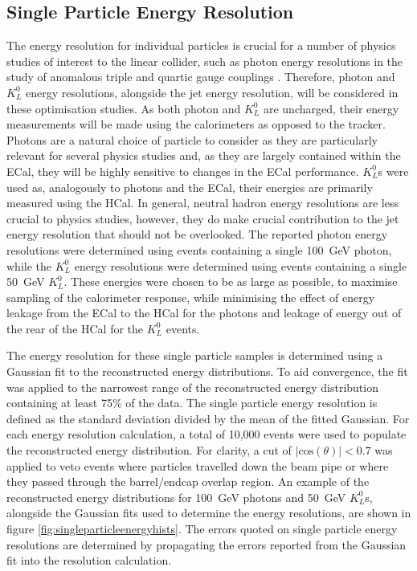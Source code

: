 \subsection{Single Particle Energy Resolution}
The energy resolution for individual particles is crucial for a number of physics studies of interest to the linear collider, such as photon energy resolutions in the study of anomalous triple and quartic gauge couplings \cite{Chatrchyan:2013fya,ATLAS:2012mec,Chatrchyan:2014bza}.  Therefore, photon and $K^{0}_{L}$ energy resolutions, alongside the jet energy resolution, will be considered in these optimisation studies.  As both photon and $K^{0}_{L}$ are uncharged, their energy measurements will be made using the calorimeters as opposed to the tracker.  Photons are a natural choice of particle to consider as they are particularly relevant for several physics studies and, as they are largely contained within the ECal, they will be highly sensitive to changes in the ECal performance.  $K^{0}_{L}$s were used as, analogously to photons and the ECal, their energies are primarily measured using the HCal.  In general, neutral hadron energy resolutions are less crucial to physics studies, however, they do make crucial contribution to the jet energy resolution that should not be overlooked.  The reported photon energy resolutions were determined using events containing a single 100~GeV photon, while the $K^{0}_{L}$ energy resolutions were determined using events containing a single 50~GeV $K^{0}_{L}$.  These energies were chosen to be as large as possible, to maximise sampling of the calorimeter response, while minimising the effect of energy leakage from the ECal to the HCal for the photons and leakage of energy out of the rear of the HCal for the $K^{0}_{L}$ events.

The energy resolution for these single particle samples is determined using a Gaussian fit to the reconstructed energy distributions.  To aid convergence, the fit was applied to the narrowest range of the reconstructed energy distribution containing at least 75\% of the data.  The single particle energy resolution is defined as the standard deviation divided by the mean of the fitted Gaussian.  For each energy resolution calculation, a total of 10,000 events were used to populate the reconstructed energy distribution.  For clarity, a cut of $|\text{cos}(\theta)| < 0.7$ was applied to veto events where particles travelled down the beam pipe or where they passed through the barrel/endcap overlap region.  An example of the reconstructed energy distributions for 100~GeV photons and 50~GeV $K^{0}_{L}$s, alongside the Gaussian fits used to determine the energy resolutions, are shown in figure \ref{fig:singleparticleenergyhists}.  The errors quoted on single particle energy resolutions are determined by propagating the errors reported from the Gaussian fit into the resolution calculation.  

